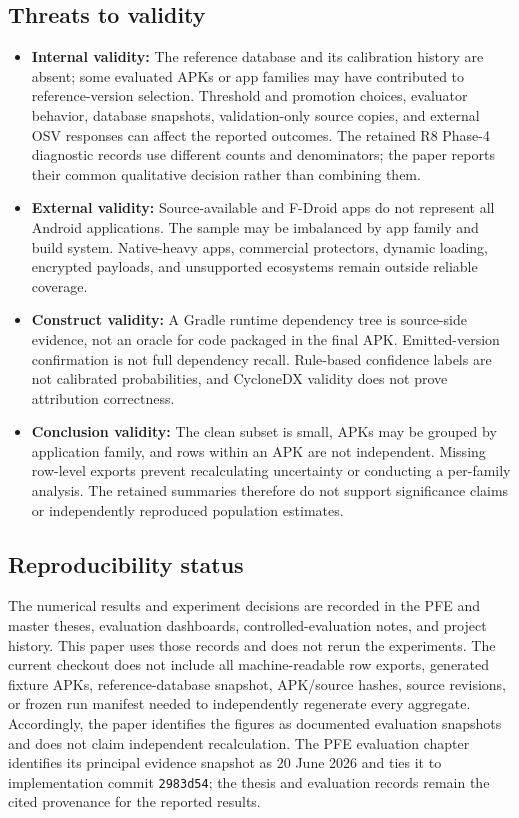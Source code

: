 \documentclass[10pt,twocolumn]{article}
\begin{document}
\subsection{Threats to validity}
\begin{itemize}
\item \textbf{Internal validity:} The reference database and its calibration history
are absent; some evaluated APKs or app families may have contributed to reference-version selection. Threshold and promotion choices, evaluator behavior, database snapshots, validation-only source copies, and external OSV responses can affect the reported outcomes. The retained R8 Phase-4 diagnostic records use different counts and denominators; the paper reports their common qualitative decision rather than combining them.
\item \textbf{External validity:} Source-available and F-Droid apps do not represent all
Android applications. The sample may be imbalanced by app family and build system. Native-heavy apps, commercial protectors, dynamic loading, encrypted payloads, and unsupported ecosystems remain outside reliable coverage.
\item \textbf{Construct validity:} A Gradle runtime dependency tree is source-side
evidence, not an oracle for code packaged in the final APK. Emitted-version confirmation is not full dependency recall. Rule-based confidence labels are not calibrated probabilities, and CycloneDX validity does not prove attribution correctness.
\item \textbf{Conclusion validity:} The clean subset is small, APKs may be grouped by
application family, and rows within an APK are not independent. Missing row-level exports prevent recalculating uncertainty or conducting a per-family analysis. The retained summaries therefore do not support significance claims or independently reproduced population estimates.
\end{itemize}
\subsection{Reproducibility status}
The numerical results and experiment decisions are recorded in the PFE and master theses, evaluation dashboards, controlled-evaluation notes, and project history. This paper uses those records and does not rerun the experiments. The current checkout does not include all machine-readable row exports, generated fixture APKs, reference-database snapshot, APK/source hashes, source revisions, or frozen run manifest needed to independently regenerate every aggregate. Accordingly, the paper identifies the figures as documented evaluation snapshots and does not claim independent recalculation. The PFE evaluation chapter identifies its principal evidence snapshot as 20 June 2026 and ties it to implementation commit \texttt{2983d54}; the thesis and evaluation records remain the cited provenance for the reported results.
\end{document}
